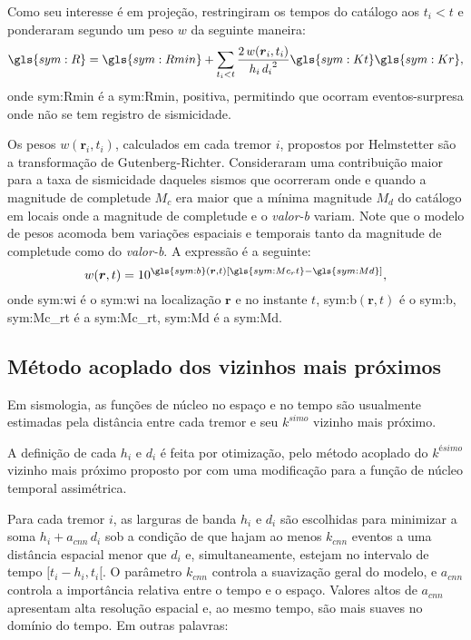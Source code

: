 Como seu interesse é em projeção, restringiram os tempos do catálogo aos $t_i
< t$ e ponderaram segundo um peso $w$ da seguinte maneira:
\begin{equation}
\ensuremath{\gls{sym:R} = \gls{sym:Rmin} + \sum_{t_i < t}{ 
	\frac{2\,w(\boldsymbol{r}_i,t_i)}{h_i\,{d_i}^2}
			\gls{sym:Kt}\gls{sym:Kr} }},
	\label{eq:helms02}
\end{equation}
onde \gls{sym:Rmin} é a \glsdesc{sym:Rmin}, positiva, permitindo que ocorram eventos-surpresa 
onde não se tem registro de sismicidade.

Os pesos $w(\boldsymbol{r}_i,t_i)$, calculados em cada tremor $i$, propostos por Helmstetter são a transformação de
Gutenberg-Richter. Consideraram uma contribuição maior para a taxa de sismicidade daqueles sismos 
que ocorreram onde e quando a magnitude de completude $M_c$ era maior que 
a mínima magnitude $M_d$ do catálogo 
em locais onde a magnitude de completude e o \emph{valor-b} variam. 
Note que o modelo de pesos acomoda bem variações espaciais e
temporais tanto da magnitude de completude como do \emph{valor-b}. A expressão é a seguinte:
\begin{equation}
	\ensuremath{ w(\boldsymbol{r},t) = 10^{ \gls{sym:b}(\boldsymbol{r},t) \left[ \gls{sym:Mc_rt} - \gls{sym:Md}
	\right] } },
	\label{eq:helms_wi}
\end{equation}
onde  \gls{sym:wi} é o \glsdesc{sym:wi} na localização $\boldsymbol{r}$ e no instante $t$, 
	  \gls{sym:b}$(\boldsymbol{r},t)$ é o \glsdesc{sym:b}, 
	  \gls{sym:Mc_rt} é a \glsdesc{sym:Mc_rt}, 
	  \gls{sym:Md} é a \glsdesc{sym:Md}.

\subsection{Método acoplado dos vizinhos mais próximos}

Em sismologia, as funções de núcleo no espaço e no tempo são usualmente estimadas
pela distância entre cada tremor e seu $k^{simo}$ vizinho mais próximo. 

A definição de cada $h_i$ e $d_i$ é feita por otimização, 
pelo método acoplado do $k^{ésimo}$ vizinho mais próximo
proposto por \citet{choi_1999}
com uma modificação para a função de núcleo temporal assimétrica.

Para cada tremor $i$, as larguras de banda  $h_i$ e $d_i$ são escolhidas para
minimizar a soma $h_i + a_{cnn}\,d_i$ sob a condição de que hajam ao menos $k_{cnn}$
eventos a uma distância espacial menor que $d_i$ e, simultaneamente, estejam
no intervalo de tempo $[t_i - h_i, t_i[$. O parâmetro $k_{cnn}$ controla a suavização 
geral do modelo, e $a_{cnn}$ controla a importância relativa entre o tempo e o espaço.
Valores altos de $a_{cnn}$ apresentam alta resolução espacial e, ao mesmo tempo, 
são mais suaves no domínio do tempo. Em outras palavras:

